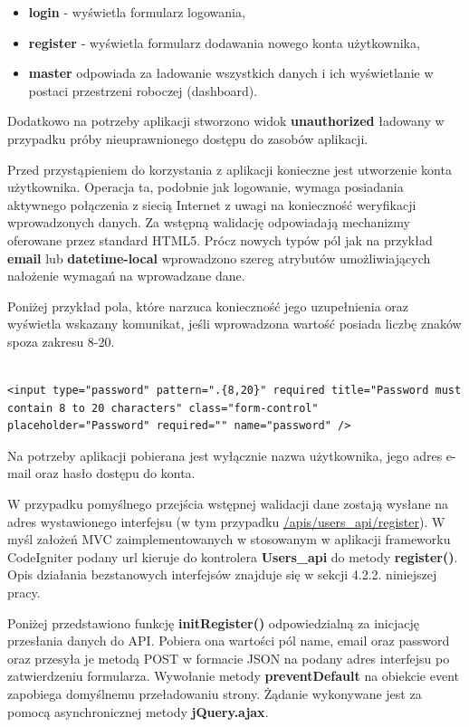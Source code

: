 \begin{itemize}
\item \textbf{login} - wyświetla formularz logowania,
\item \textbf{register} - wyświetla formularz dodawania nowego konta użytkownika,
\item \textbf{master} odpowiada za ładowanie wszystkich danych i ich wyświetlanie w postaci przestrzeni roboczej (dashboard).
\end{itemize}

Dodatkowo na potrzeby aplikacji stworzono widok \textbf{unauthorized} ładowany w przypadku próby nieuprawnionego dostępu do zasobów aplikacji.

Przed przystąpieniem do korzystania z aplikacji konieczne jest utworzenie konta użytkownika. Operacja ta, podobnie jak logowanie, wymaga posiadania aktywnego połączenia z siecią Internet z uwagi na konieczność weryfikacji wprowadzonych danych. Za wstępną walidację odpowiadają mechanizmy oferowane przez standard HTML5\cite{html5Valid}. Prócz nowych typów pól jak na przykład \textbf{email} lub \textbf{datetime-local} wprowadzono szereg atrybutów umożliwiających nałożenie wymagań na wprowadzane dane.

Poniżej przykład pola, które narzuca konieczność jego uzupełnienia oraz wyświetla wskazany komunikat, jeśli wprowadzona wartość posiada liczbę znaków spoza zakresu 8-20.

\begin{lstlisting}[caption=Przykład pola "hasło" w widoku rejestracji., label=amb, captionpos=b]

<input type="password" pattern=".{8,20}" required title="Password must contain 8 to 20 characters" class="form-control" placeholder="Password" required="" name="password" />

\end{lstlisting}

Na potrzeby aplikacji pobierana jest wyłącznie nazwa użytkownika, jego adres e-mail oraz hasło dostępu do konta.

W przypadku pomyślnego przejścia wstępnej walidacji dane zostają wysłane na adres wystawionego interfejsu (w tym przypadku \url{/apis/users_api/register}). W myśl założeń MVC zaimplementowanych w stosowanym w aplikacji frameworku CodeIgniter podany url kieruje do kontrolera \textbf{Users\_api} do metody \textbf{register()}. Opis działania bezstanowych interfejsów znajduje się w sekcji 4.2.2. niniejszej pracy.

Poniżej przedstawiono funkcję \textbf{initRegister()} odpowiedzialną za inicjację przesłania danych do API. Pobiera ona wartości pól name, email oraz password oraz przesyła je metodą POST w formacie JSON na podany adres interfejsu po zatwierdzeniu formularza. Wywołanie metody \textbf{preventDefault} na obiekcie event zapobiega domyślnemu przeładowaniu strony. Żądanie wykonywane jest za pomocą asynchronicznej metody \textbf{jQuery.ajax}.

